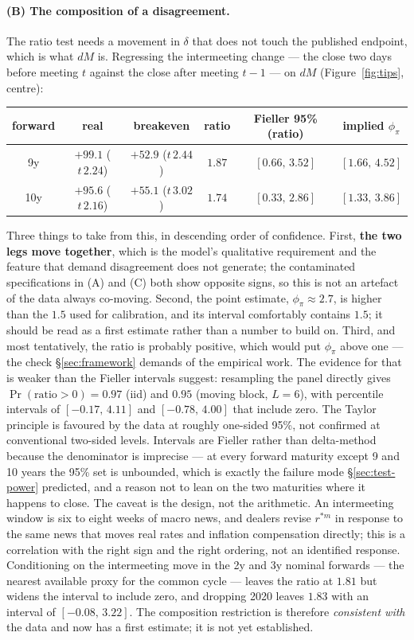 \documentclass[11pt]{article}
\begin{document}
\paragraph{(B) The composition of a disagreement.} The ratio test needs a
movement in $\delta$ that does not touch the published endpoint, which is what
$dM$ is. Regressing the intermeeting change --- the close two days before
meeting $t$ against the close after meeting $t-1$ --- on $dM$
(Figure~\ref{fig:tips}, centre):
\begin{center}\small
\begin{tabular}{cccccc}
\toprule
forward & real & breakeven & ratio & Fieller 95\% (ratio) & implied $\phi_\pi$\\
\midrule
9y & $+99.1$ ($t\,2.24$) & $+52.9$ ($t\,2.44$) & $1.87$ & $[0.66,\,3.52]$ & $[1.66,\,4.52]$\\
10y & $+95.6$ ($t\,2.16$) & $+55.1$ ($t\,3.02$) & $1.74$ & $[0.33,\,2.86]$ & $[1.33,\,3.86]$\\
\bottomrule
\end{tabular}
\end{center}
\noindent Three things to take from this, in descending order of confidence.
First, \textbf{the two legs move together}, which is the model's qualitative
requirement and the feature that demand disagreement does not generate; the
contaminated specifications in (A) and (C) both show opposite signs, so this is
not an artefact of the data always co-moving. Second, the point estimate,
$\phi_\pi\approx2.7$, is higher than the $1.5$ used for calibration, and its
interval comfortably contains $1.5$; it should be read as a first estimate
rather than a number to build on. Third, and most tentatively, the ratio is
probably positive, which would put $\phi_\pi$ above one --- the check
\S\ref{sec:framework} demands of the empirical work. The evidence for that is
weaker than the Fieller intervals suggest: resampling the panel directly gives
$\Pr(\text{ratio}>0)=0.97$ (iid) and $0.95$ (moving block, $L=6$), with
percentile intervals of $[-0.17,\,4.11]$ and $[-0.78,\,4.00]$ that include
zero. The Taylor principle is favoured by the data at roughly one-sided 95\%,
not confirmed at conventional two-sided levels. Intervals are Fieller rather than delta-method
because the denominator is imprecise --- at every forward maturity except 9 and
10 years the 95\% set is unbounded, which is exactly the failure mode
\S\ref{sec:test-power} predicted, and a reason not to lean on the two
maturities where it happens to close.
The caveat is the design, not the arithmetic. An intermeeting window is six to
eight weeks of macro news, and dealers revise $r^{*m}$ in response to the same
news that moves real rates and inflation compensation directly; this is a
correlation with the right sign and the right ordering, not an identified
response. Conditioning on the intermeeting move in the 2y and 3y nominal
forwards --- the nearest available proxy for the common cycle --- leaves the
ratio at $1.81$ but widens the interval to include zero, and dropping 2020
leaves $1.83$ with an interval of $[-0.08,\,3.22]$. The composition
restriction is therefore \emph{consistent with} the data and now has a first
estimate; it is not yet established.
\end{document}
